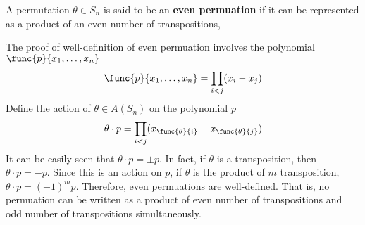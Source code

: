 \begin{definition}
    A permutation \(\theta \in S_n\) is said to be an \textbf{even permuation} if it can be represented as a product of an even number of transpositions, 
\end{definition}

The proof of well-definition of even permuation involves the polynomial \(\func{p}{x_1, \dots,x_n}\)
\begin{equation*}
    \func{p}{x_1,\dots, x_n} = \prod_{i < j} (x_i - x_j)
\end{equation*}
Define the action of \(\theta \in A(S_n)\) on the polynomial \(p\)
\begin{equation*}
    \theta \cdot p = \prod_{i < j} (x_{\func{\theta}{i}} - x_{\func{\theta}{j}})
\end{equation*}
It can be easily seen that \(\theta \cdot p = \pm p\). In fact, if \(\theta\) is a transposition, then \(\theta \cdot p = -p\). Since this is an action on \(p\), if \(\theta\) is the product of \(m\) transposition, \(\theta \cdot p = (-1)^m p\). Therefore, even permuations are well-defined. That is, no permuation can be written as a product of even number of transpositions and odd number of transpositions simultaneously.

